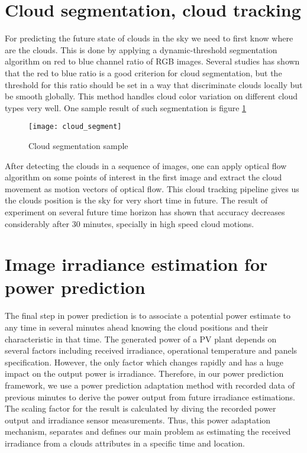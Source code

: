 \section{Cloud segmentation, cloud tracking}
For predicting the future state of clouds in the sky we need to first know where are the clouds. This is done by applying a dynamic-threshold segmentation algorithm on red to blue channel ratio of RGB images. Several studies has shown that the red to blue ratio is a good criterion for cloud segmentation, but the threshold for this ratio should be set in a way that discriminate clouds locally but be smooth globally. This method handles cloud color variation on different cloud types very well. One sample result of such segmentation is figure \ref{fig:cloud_seg}
\begin{figure}[h]
\caption{Cloud segmentation sample}
\label{fig:cloud_seg}
\texttt{[image: cloud\_segment]}
\centering
\end{figure}

After detecting the clouds in a sequence of images, one can apply optical flow algorithm on some points of interest in the first image and extract the cloud movement as motion vectors of optical flow. This cloud tracking pipeline gives us the clouds position is the sky for very short time in future. The result of experiment on several future time horizon has shown that accuracy decreases considerably after 30 minutes, specially in high speed cloud motions.

\section{Image irradiance estimation for power prediction}
The final step in power prediction is to associate a potential power estimate to any time in several minutes ahead knowing the cloud positions and their characteristic in that time. The generated power of a PV plant depends on several factors including received irradiance, operational temperature and panels specification. However, the only factor which changes rapidly and has a huge impact on the output power is irradiance. Therefore, in our power prediction framework, we use a power prediction adaptation method with recorded data of previous minutes to derive the power output from future irradiance estimations. The scaling factor for the result is calculated by diving the recorded power output and irradiance sensor measurements. Thus, this power adaptation mechanism, separates and defines our main problem as estimating the received irradiance from a clouds attributes in a specific time and location.

